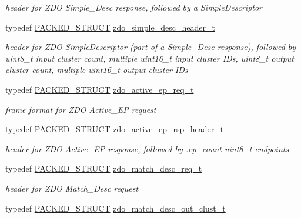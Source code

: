 \begin{DoxyCompactItemize}
\begin{DoxyCompactList}\small\item\em header for Z\+DO Simple\+\_\+\+Desc response, followed by a Simple\+Descriptor \end{DoxyCompactList}\item 
typedef \hyperlink{group___s_x_a_ga4233297bd31be5c273d4fb0758cc54d7}{P\+A\+C\+K\+E\+D\+\_\+\+S\+T\+R\+U\+CT} \hyperlink{group__zdo_ga2fcb208122b12b93deec95fa934cf40d}{zdo\+\_\+simple\+\_\+desc\+\_\+header\+\_\+t}
\begin{DoxyCompactList}\small\item\em header for Z\+DO Simple\+Descriptor (part of a Simple\+\_\+\+Desc response), followed by uint8\+\_\+t input cluster count, multiple uint16\+\_\+t input cluster I\+Ds, uint8\+\_\+t output cluster count, multiple uint16\+\_\+t output cluster I\+Ds \end{DoxyCompactList}\item 
typedef \hyperlink{group___s_x_a_ga4233297bd31be5c273d4fb0758cc54d7}{P\+A\+C\+K\+E\+D\+\_\+\+S\+T\+R\+U\+CT} \hyperlink{group__zdo_ga54a6580e6f7572ca6014963d3e03e735}{zdo\+\_\+active\+\_\+ep\+\_\+req\+\_\+t}
\begin{DoxyCompactList}\small\item\em frame format for Z\+DO Active\+\_\+\+EP request \end{DoxyCompactList}\item 
typedef \hyperlink{group___s_x_a_ga4233297bd31be5c273d4fb0758cc54d7}{P\+A\+C\+K\+E\+D\+\_\+\+S\+T\+R\+U\+CT} \hyperlink{group__zdo_ga47a4305044809f1e37b1a88c3232676a}{zdo\+\_\+active\+\_\+ep\+\_\+rsp\+\_\+header\+\_\+t}
\begin{DoxyCompactList}\small\item\em header for Z\+DO Active\+\_\+\+EP response, followed by {\ttfamily }.ep\+\_\+count uint8\+\_\+t endpoints \end{DoxyCompactList}\item 
typedef \hyperlink{group___s_x_a_ga4233297bd31be5c273d4fb0758cc54d7}{P\+A\+C\+K\+E\+D\+\_\+\+S\+T\+R\+U\+CT} \hyperlink{group__zdo_gac4eb6edc67f4b6c7cfb7b876f86c7316}{zdo\+\_\+match\+\_\+desc\+\_\+req\+\_\+t}
\begin{DoxyCompactList}\small\item\em header for Z\+DO Match\+\_\+\+Desc request \end{DoxyCompactList}\item 
typedef \hyperlink{group___s_x_a_ga4233297bd31be5c273d4fb0758cc54d7}{P\+A\+C\+K\+E\+D\+\_\+\+S\+T\+R\+U\+CT} \hyperlink{group__zdo_ga58933040f33055a85f168d27cba35b02}{zdo\+\_\+match\+\_\+desc\+\_\+out\+\_\+clust\+\_\+t}

\end{DoxyCompactItemize}
